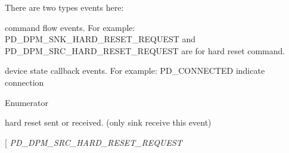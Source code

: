 There are two types events here\-:
\begin{DoxyItemize}
\item command flow events. For example\-: P\-D\-\_\-\-D\-P\-M\-\_\-\-S\-N\-K\-\_\-\-H\-A\-R\-D\-\_\-\-R\-E\-S\-E\-T\-\_\-\-R\-E\-Q\-U\-E\-S\-T and P\-D\-\_\-\-D\-P\-M\-\_\-\-S\-R\-C\-\_\-\-H\-A\-R\-D\-\_\-\-R\-E\-S\-E\-T\-\_\-\-R\-E\-Q\-U\-E\-S\-T are for hard reset command.
\item device state callback events. For example\-: P\-D\-\_\-\-C\-O\-N\-N\-E\-C\-T\-E\-D indicate connection 
\end{DoxyItemize}\begin{Desc}
\item[Enumerator]\par
\begin{description}
\item[{\em 
\hypertarget{group__usb__pd__stack_gga6e10571af6af1a42760ea442ab580eb8a65ddff38ff9b959107bdabc53a1d1713}{P\-D\-\_\-\-D\-P\-M\-\_\-\-S\-N\-K\-\_\-\-H\-A\-R\-D\-\_\-\-R\-E\-S\-E\-T\-\_\-\-R\-E\-Q\-U\-E\-S\-T}\label{group__usb__pd__stack_gga6e10571af6af1a42760ea442ab580eb8a65ddff38ff9b959107bdabc53a1d1713}
}]hard reset sent or received. (only sink receive this event) \item[{\em 
\hypertarget{group__usb__pd__stack_gga6e10571af6af1a42760ea442ab580eb8a64e92f523589e05e41df27ce310855ae}{P\-D\-\_\-\-D\-P\-M\-\_\-\-S\-R\-C\-\_\-\-H\-A\-R\-D\-\_\-\-R\-E\-S\-E\-T\-\_\-\-R\-E\-Q\-U\-E\-S\-T}\label{group__usb__pd__stack_gga6e10571af6af1a42760ea442ab580eb8a64e92f523589e05e41df27ce310855ae}
}
\end{description}
\end{Desc}
